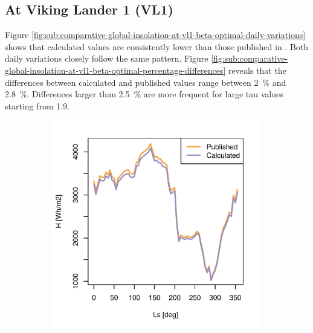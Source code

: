 \subsection{At Viking Lander 1 (VL1)}
Figure \ref{fig:sub:comparative-global-insolation-at-vl1-beta-optimal-daily-variations} shows that calculated values are consistently lower than those published in . Both daily variations closely follow the same pattern. Figure \ref{fig:sub:comparative-global-insolation-at-vl1-beta-optimal-percentage-differences} reveals that the differences between calculated and published values range between \SI{2}{\percent} and \SI{2.8}{\percent}. Differences larger than \SI{2.5}{\percent} are more frequent for large tau values starting from 1.9.

\begin{figure}[H]
\captionsetup[subfigure]{justification=centering}
\vspace{-2ex}
\centering
    \setlength{\subfigureWidth}{0.50\textwidth}
    \setlength{\graphicsHeight}{80mm}
    \hypersetup{hidelinks=true}%
    \begin{subfigure}[t]{\subfigureWidth}
        \centering
            \includegraphics[height=\graphicsHeight]{sections/appendix/A/plots/h-exp-calc-at-vl1-with-beta-65-deg.png}

\end{subfigure}
\end{figure}
